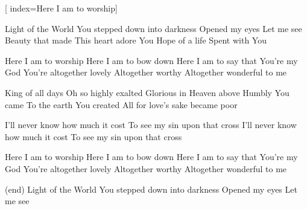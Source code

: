 
\repchoruses

[
index={Here I am to worship}]               %



\beginverse
Light of the World
You stepped down into darkness
Opened my eyes
Let me see
Beauty that made
This heart adore You
Hope of a life
Spent with You
\endverse

\beginchorus
Here I am to worship
Here I am to bow down
Here I am to say that You're my God
You're altogether lovely
Altogether worthy
Altogether wonderful to me
\endchorus

\beginverse
King of all days
Oh so highly exalted
Glorious in Heaven above
Humbly You came
To the earth You created
All for love's sake became poor
\endverse                         

\beginverse*
I'll never know how much it cost
To see my sin upon that cross
I'll never know how much it cost
To see my sin upon that cross \linebreak
\endverse   

\beginchorus
Here I am to worship
Here I am to bow down
Here I am to say that You're my God
You're altogether lovely
Altogether worthy
Altogether wonderful to me
\endchorus


\beginverse*
(end)
Light of the World
You stepped down into darkness
Opened my eyes
Let me see
\endverse   


\norepchoruses

\endsong
